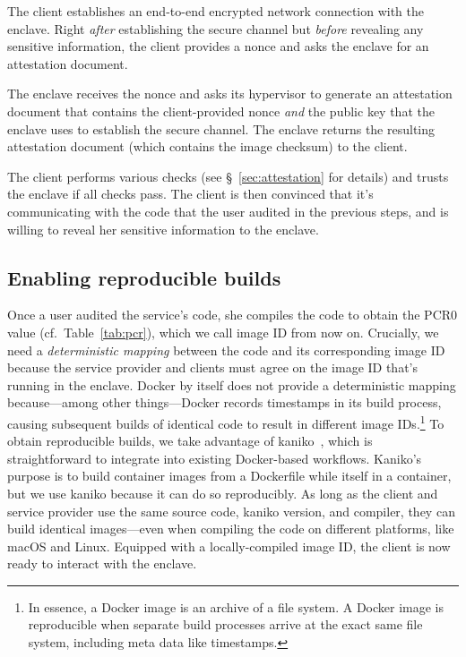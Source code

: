  The client establishes an end-to-end encrypted network connection
with the enclave.  Right \emph{after} establishing the secure channel but
\emph{before} revealing any sensitive information, the client provides a nonce
and asks the enclave for an attestation document.

 The enclave receives the nonce and asks its hypervisor to generate an
attestation document that contains the client-provided nonce \emph{and} the
public key that the enclave uses to establish the secure channel.  The enclave
returns the resulting attestation document (which contains the image checksum)
to the client.

 The client performs various checks (see \S~\ref{sec:attestation} for
details) and trusts the enclave if all checks pass.  The client is then
convinced that it's communicating with the code that the user audited in the
previous steps, and is willing to reveal her sensitive information to the
enclave.

\subsection{Enabling reproducible builds}%
\label{sec:build-system}

Once a user audited the service's code, she compiles the code to obtain the PCR0
value (cf.~Table~\ref{tab:pcr}), which we call image ID from now on.  Crucially,
we need a \emph{deterministic mapping} between the code and its corresponding
image ID because the service provider and clients must agree on the image ID
that's running in the enclave.  Docker by itself does not provide a
deterministic mapping because---among other things---Docker records timestamps
in its build process, causing subsequent builds of identical code to result in
different image IDs.\footnote{In essence, a Docker image is an archive of a file
system.  A Docker image is reproducible when separate build processes arrive at
the exact same file system, including meta data like timestamps.}  To obtain
reproducible builds, we take advantage of kaniko~\cite{kaniko}, which is
straightforward to integrate into existing Docker-based workflows.  Kaniko's
purpose is to build container images from a Dockerfile while itself in a
container, but we use kaniko because it can do so reproducibly.  As long as the
client and service provider use the same source code, kaniko version, and
compiler, they can build identical images---even when compiling the code on
different platforms, like macOS and Linux.  Equipped with a locally-compiled
image ID, the client is now ready to interact with the enclave.

